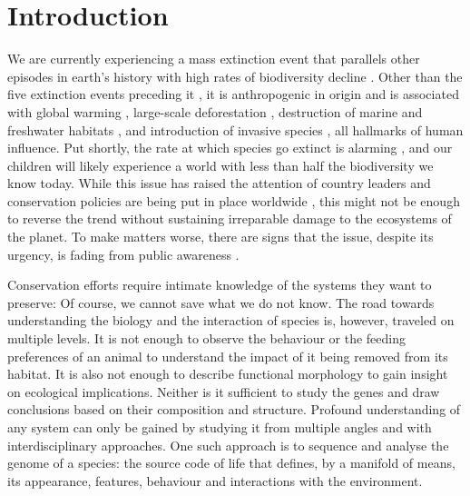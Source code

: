 \chapter{Introduction}
\label{introduction}

We are currently experiencing a mass extinction event that parallels other episodes in earth's history with high rates of biodiversity decline \citep{Pimm1995, Dirzo2003, Schipper2008, Barnosky2011, Dirzo2014}. Other than the five extinction events preceding it \citep{Kolbert2014}, it is anthropogenic in origin \citep{Leakey1996, Ceballos2015} and is associated with global warming \citep{Cook2016, Wuebbles2017}, large-scale deforestation \citep{Wright2005}, destruction of marine and freshwater habitats \citep{Burkhead2012}, and introduction of invasive species \citep{Mooney2001}, all hallmarks of human influence. Put shortly, the rate at which species go extinct is alarming \citep{Newbold2016, Ceballos2017, Hallmann2017}, and our children will likely experience a world with less than half the biodiversity we know today. While this issue has raised the attention of country leaders and conservation policies are being put in place worldwide \citep{Puntaru2017}, this might not be enough to reverse the trend without sustaining irreparable damage to the ecosystems of the planet. To make matters worse, there are signs that the issue, despite its urgency, is fading from public awareness \citep{Kusmanoff2017}. 

Conservation efforts require intimate knowledge of the systems they want to preserve: Of course, we cannot save what we do not know. The road towards understanding the biology and the interaction of species is, however, traveled on multiple levels. It is not enough to observe the behaviour or the feeding preferences of an animal to understand the impact of it being removed from its habitat. It is also not enough to describe functional morphology to gain insight on ecological implications. Neither is it sufficient to study the genes and draw conclusions based on their composition and structure. Profound understanding of any system can only be gained by studying it from multiple angles and with interdisciplinary approaches. One such approach is to sequence and analyse the genome of a species: the source code of life that defines, by a manifold of means, its appearance, features, behaviour and interactions with the environment.
